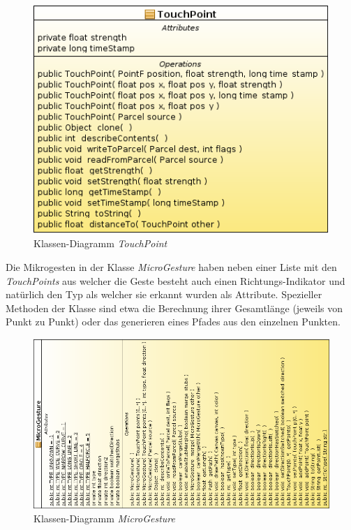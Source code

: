 \begin{figure}[h!]
   \centering
   \includegraphics[width=\textwidth]{img/uml_cd_tp} 
   \caption{Klassen-Diagramm \emph{TouchPoint}}
   \label{fig:cd_touchpoint}
\end{figure}

Die Mikrogesten in der Klasse \emph{MicroGesture} haben neben einer Liste mit den \emph{TouchPoints} aus welcher die Geste besteht auch einen Richtungs-Indikator und natürlich den Typ als welcher sie erkannt wurden als Attribute. Spezieller Methoden der Klasse sind etwa die Berechnung ihrer Gesamtlänge (jeweils von Punkt zu Punkt) oder das generieren eines Pfades aus den einzelnen Punkten.

\begin{figure}[h!]
   \centering
   \includegraphics[width=\textwidth]{img/uml_cd_mg} 
   \caption{Klassen-Diagramm \emph{MicroGesture}}
   \label{fig:cd_microgesture}
\end{figure}

